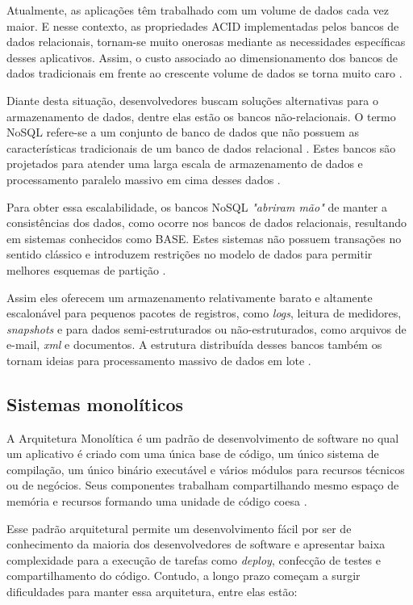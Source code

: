 Atualmente, as aplicações têm trabalhado com um volume de dados cada vez maior.
E nesse contexto, as propriedades \gls{ACID} implementadas pelos bancos de dados relacionais,
tornam-se muito onerosas mediante as necessidades específicas desses aplicativos.
Assim, o custo associado ao dimensionamento dos bancos de dados tradicionais em
frente ao crescente volume de dados se torna muito caro \cite{Gajendran}.

Diante desta situação, desenvolvedores buscam soluções alternativas para o
armazenamento de dados, dentre elas estão os bancos não-relacionais. O termo
\gls{NoSQL} refere-se a um conjunto de banco de dados que não possuem as características
tradicionais de um banco de dados relacional \cite{Gajendran}. Estes bancos são projetados
para atender uma larga escala de armazenamento de dados e processamento paralelo
massivo em cima desses dados \cite{NewEraOfDatabases}.

Para obter essa escalabilidade, os bancos \gls{NoSQL} \textit{"abriram mão"} de
manter a consistências dos dados, como ocorre nos bancos de dados relacionais,
resultando em sistemas conhecidos como \gls{BASE}. Estes sistemas não possuem
transações no sentido clássico e introduzem restrições no modelo de dados
para permitir melhores esquemas de partição .

Assim eles oferecem um armazenamento relativamente barato e altamente escalonável
para pequenos pacotes de registros, como \textit{logs}, leitura de medidores,
\textit{snapshots} e para dados semi-estruturados ou não-estruturados, como arquivos
de e-mail, \textit{xml} e documentos. A estrutura distribuída desses bancos também
os tornam ideias para processamento massivo de dados em lote \cite{NewEraOfDatabases}.

\subsection{Sistemas monolíticos}

A Arquitetura Monolítica é um padrão de desenvolvimento de software no qual um aplicativo
é criado com uma única base de código, um único sistema de compilação, um único binário
executável e vários módulos para recursos técnicos ou de negócios. Seus componentes
trabalham compartilhando mesmo espaço de memória e recursos formando uma unidade de
código coesa \cite{NatalliaSakovich}.

Esse padrão arquitetural permite um desenvolvimento fácil por ser de conhecimento
da maioria dos desenvolvedores de software e apresentar baixa complexidade para a
execução de tarefas como \textit{deploy}, confecção de testes e compartilhamento
do código. Contudo, a longo prazo começam a surgir dificuldades para manter essa
arquitetura, entre elas estão:

